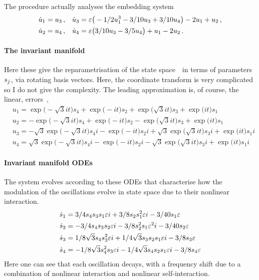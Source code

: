 The procedure actually analyses the embedding system
\begin{align*}&
\dot u_{1}=u\sb3\,,
&&
\dot u_{3}=\varepsilon \big(-1/2 u\sb1^{3}-3/10 u\sb3+3/10 u\sb4\big)-2 
u\sb1+u\sb2\,,
\\&
\dot u_{2}=u\sb4\,,
&&
\dot u_{4}=\varepsilon \big(3/10 u\sb3-3/5 u\sb4\big)+u\sb1-2 u\sb2\,.
\end{align*}



\paragraph{The invariant manifold} 
Here these give the reparametrisation of the state space~\uv\ in
terms of parameters~\(s\sb j\), via rotating basis vectors.
Here, the coordinate transform is very complicated so I do not give the complexity.  The leading approximation is, of course, the linear, errors~,
\begin{align*}&
u_{1}=\exp \big(-\sqrt {3} i t\big) s_{4}+\exp \big(-i t\big) s_{2}+\exp
 \big(\sqrt {3} i t\big) s_{3}+\exp \big(i t\big) s_{1}
\\&
u_{2}=-\exp \big(-\sqrt {3} i t\big) s_{4}+\exp \big(-i t\big) s_{2}-
\exp \big(\sqrt {3} i t\big) s_{3}+\exp \big(i t\big) s_{1}
\\&
u_{3}=-\sqrt {3} \exp \big(-\sqrt {3} i t\big) s_{4} i-\exp \big(-i t
\big) s_{2} i+\sqrt {3} \exp \big(\sqrt {3} i t\big) s_{3} i+\exp \big(i
 t\big) s_{1} i
\\&
u_{4}=\sqrt {3} \exp \big(-\sqrt {3} i t\big) s_{4} i-\exp \big(-i t
\big) s_{2} i-\sqrt {3} \exp \big(\sqrt {3} i t\big) s_{3} i+\exp \big(i
 t\big) s_{1} i
\end{align*}

 
\paragraph{Invariant manifold ODEs} 
The system evolves according to these ODEs that characterise how the modulation of the oscillations evolve in state space due to their nonlinear interaction.
\begin{align*}&
\dot s_{1}=3/4 s_{4} s_{3} s_{1} \varepsilon i+3/8 s_{2} s_{1}^{2} \varepsilon
 i-3/40 s_{1} \varepsilon
\\&
\dot s_{2}=-3/4 s_{4} s_{3} s_{2} \varepsilon i-3/8 s_{2}^{2} s_{1} \varepsilon^{2
} i-3/40 s_{2} \varepsilon
\\&
\dot s_{3}=1/8 \sqrt {3} s_{4} s_{3}^{2} \varepsilon i+1/4 \sqrt {3} s_{3} 
s_{2} s_{1} \varepsilon i-3/8 s_{3} \varepsilon
\\&
\dot s_{4}=-1/8 \sqrt {3} s_{4}^{2} s_{3} \varepsilon i-1/4 \sqrt {3} s_{4}
 s_{2} s_{1} \varepsilon i-3/8 s_{4} \varepsilon
\end{align*}
Here one can see that each oscillation decays, with a frequency shift due to a combination of nonlinear interaction and nonlinear self-interaction.

